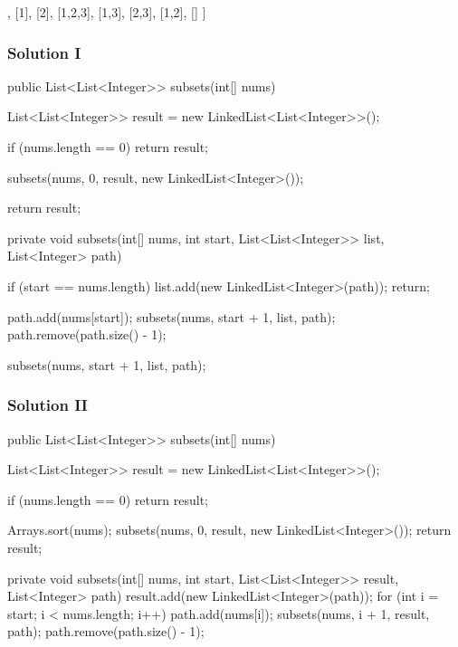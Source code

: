 \begin{Code}
[
  [3],
  [1],
  [2],
  [1,2,3],
  [1,3],
  [2,3],
  [1,2],
  []
]
\end{Code}

\subsubsection{Solution I}

\begin{Code}
public List<List<Integer>> subsets(int[] nums) {
    List<List<Integer>> result = new LinkedList<List<Integer>>();

    if (nums.length == 0) {
        return result;
    }

    subsets(nums, 0, result, new LinkedList<Integer>());

    return result;
}

private void subsets(int[] nums, int start, List<List<Integer>> list, List<Integer> path) {
    if (start == nums.length) {
        list.add(new LinkedList<Integer>(path));
        return;
    }

    path.add(nums[start]);
    subsets(nums, start + 1, list, path);
    path.remove(path.size() - 1);

    subsets(nums, start + 1, list, path);
}
\end{Code}

\newpage

\subsubsection{Solution II}

\begin{Code}
public List<List<Integer>> subsets(int[] nums) {
    List<List<Integer>> result = new LinkedList<List<Integer>>();

    if (nums.length == 0) {
        return result;
    }

    Arrays.sort(nums);
    subsets(nums, 0, result, new LinkedList<Integer>());
    return result;
}

private void subsets(int[] nums, int start, List<List<Integer>> result, List<Integer> path) {
    result.add(new LinkedList<Integer>(path));
    for (int i = start; i < nums.length; i++) {
        path.add(nums[i]);
        subsets(nums, i + 1, result, path);
        path.remove(path.size() - 1);
    }
}
\end{Code}

\newpage

